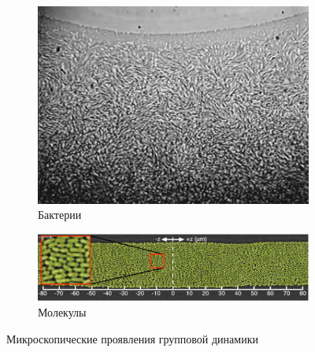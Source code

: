     \begin{figure}
    	\centering
        \begin{subfigure}{0.3\textwidth}
                \includegraphics[width=\textwidth]{Images/Fig11_CollectiveMotion}
                \caption{Бактерии}
                \label{fig:CollMot:bacteria}
        \end{subfigure}
        \begin{subfigure}{0.5\textwidth}
                \includegraphics[width=\textwidth]{Images/Fig15_CollectiveMotion_part}
                \caption{Молекулы}
                \label{fig:CollMot:moleculae}
        \end{subfigure}
        \caption{Микроскопические проявления групповой динамики}
        \label{fig:CollMot:microscpoic}
    \end{figure}
